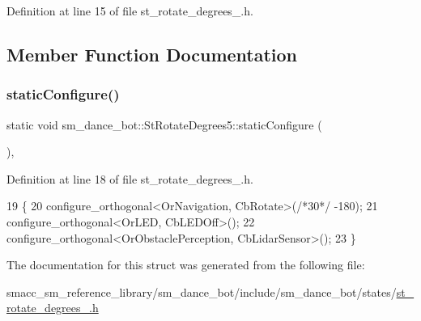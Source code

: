 Definition at line 15 of file st\+\_\+rotate\+\_\+degrees\+\_.\+h.



\subsection{Member Function Documentation}
\mbox{\label{structsm__dance__bot_1_1StRotateDegrees5_a60fd6ec21fe69a27245785e83b610b57}} 
\subsubsection{\texorpdfstring{static\+Configure()}{staticConfigure()}}
{\footnotesize\ttfamily static void sm\+\_\+dance\+\_\+bot\+::\+St\+Rotate\+Degrees5\+::static\+Configure (\begin{DoxyParamCaption}{ }\end{DoxyParamCaption})\hspace{0.3cm}{\ttfamily [inline]}, {\ttfamily [static]}}



Definition at line 18 of file st\+\_\+rotate\+\_\+degrees\+\_.\+h.


\begin{DoxyCode}
19   \{
20     configure\_orthogonal<OrNavigation, CbRotate>(\textcolor{comment}{/*30*/} -180);
21     configure\_orthogonal<OrLED, CbLEDOff>();
22     configure\_orthogonal<OrObstaclePerception, CbLidarSensor>();
23   \}
\end{DoxyCode}


The documentation for this struct was generated from the following file\+:\begin{DoxyCompactItemize}
\item 
smacc\+\_\+sm\+\_\+reference\+\_\+library/sm\+\_\+dance\+\_\+bot/include/sm\+\_\+dance\+\_\+bot/states/\hyperlink{sm__dance__bot_2include_2sm__dance__bot_2states_2st__rotate__degrees__5_8h}{st\+\_\+rotate\+\_\+degrees\+\_.\+h}\end{DoxyCompactItemize}

